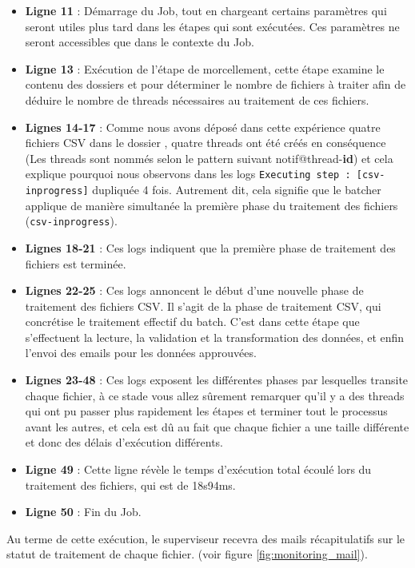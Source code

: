 \begin{itemize}
    \item \textbf{Ligne 11} : Démarrage du Job, tout en chargeant certains paramètres qui seront utiles plus tard dans les étapes qui sont exécutées. Ces paramètres ne seront accessibles que dans le contexte du Job.
    \item \textbf{Ligne 13} : Exécution de l'étape de morcellement, cette étape examine le contenu des dossiers  et  pour déterminer le nombre de fichiers à traiter afin de déduire le nombre de threads nécessaires au traitement de ces fichiers.
    \item \textbf{Lignes 14-17} : Comme nous avons déposé dans cette expérience quatre fichiers CSV dans le dossier , quatre threads ont été créés en conséquence (Les threads sont nommés selon le pattern suivant notif@thread-\textbf{id}) et cela explique pourquoi nous observons dans les logs \lstinline|Executing step : [csv-inprogress]| dupliquée 4 fois. Autrement dit, cela signifie que le batcher applique de manière simultanée la première phase du traitement des fichiers (\lstinline|csv-inprogress|).
    \item \textbf{Lignes 18-21} : Ces logs indiquent que la première phase de traitement des fichiers est terminée.
    \item \textbf{Lignes 22-25} : Ces logs annoncent le début d'une nouvelle phase de traitement des fichiers CSV. Il s'agit de la phase de traitement CSV, qui concrétise le traitement effectif du batch. C'est dans cette étape que s'effectuent la lecture, la validation et la transformation des données, et enfin l'envoi des emails pour les données approuvées.
    \item \textbf{Lignes 23-48} : Ces logs exposent les différentes phases par lesquelles transite chaque fichier, à ce stade vous allez sûrement remarquer qu'il y a des threads qui ont pu passer plus rapidement les étapes et terminer tout le processus avant les autres, et cela est dû au fait que chaque fichier a une taille différente et donc des délais d'exécution différents.
    \item \textbf{Ligne 49} : Cette ligne révèle le temps d'exécution total écoulé lors du traitement des fichiers, qui est de 18s94ms. 
    \item \textbf{Ligne 50} : Fin du Job. 
\end{itemize}
Au terme de cette exécution, le superviseur recevra des mails récapitulatifs sur le statut de traitement de chaque fichier. (voir figure \ref{fig:monitoring_mail}).
